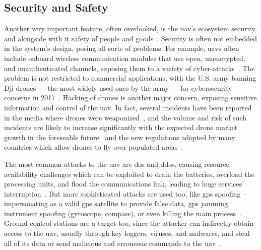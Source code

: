 \subsection{Security and Safety}%
\label{sec:security-safety}
Another very important feature, often overlooked, is the \gls{uav}'s ecosystem
security, and alongside with it safety of people and goods~\cite{leccadito2018survey}. Security is often
not embedded in the system's design, posing all sorts of problems. For example,
\glspl{uav} often include onboard wireless communication modules that use open,
unencrypted, and unauthenticated channels, exposing them to a variety of
cyber-attacks~\cite{kishnaCyberVulnerUAVReview2017,mansfieldUAVCyberThreats2013}.
The problem is not restricted to
commercial applications, with the U.S. army banning Dji drones --- the most
widely used ones by the army --- for cybersecurity
concerns in 2017~\cite{suasNewsDjiDronesBanned2017}. Hacking of drones is
another major concern, exposing sensitive information and control of the
\gls{uav}. In fact, several incidents have been reported in the media where
drones were weaponized~\cite{spiegelUAVAccident2015,nytimesUAVAccident2018,theDriveUAVAccident2019}, and the volume and risk of such incidents are
likely to increase significantly with the expected drone market growth in the
foreseable future~\cite{mohsan2022towards} and the new regulations adopted by many countries which allow
drones to fly over populated areas~\cite{stocker2017UAVRegulationsReview}.

The most common attacks to the  \gls{uav} are \gls{dos} and \gls{ddos}, causing
resource availability challenges which can be exploited to drain the batteries,
overload the processing units, and flood the communications link, leading to
huge services' interruption~\cite{mohsan2022towards}. But more sophisticated attacks are used too, like
\gls{gps} spoofing -- impersonating as a valid \gls{gps} satellite to provide
false data, \gls{gps} jamming, instrument spoofing (gyroscope, compass), or even
killing the main process~\cite{nassi2021sok}. Ground control stations are a target too, since the
attacker can indirectly obtain access to the \gls{uav}, usually through key
loggers, viruses, and malwares,  and steal all of its data or send malicious
and erroneous commands to the \gls{uav}~\cite{mohsan2022towards}.

